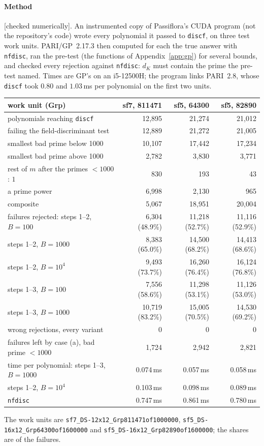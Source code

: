 \documentclass[10pt,a4paper]{article}
\newcommand{\code}[1]{\texttt{#1}}
\newcommand{\stnum}{\textsf{\small[checked numerically]}\xspace}
\theoremstyle{plain}
\theoremstyle{definition}
\begin{document}
\paragraph{Method} \stnum.  An instrumented copy of Passiflora's CUDA program (not the repository's code) wrote every polynomial
it passed to \code{discf}, on three test work units.  PARI/GP~2.17.3 then computed for each the true answer with \code{nfdisc}, ran
the pre-test (the functions of Appendix~\ref{app:gp}) for several bounds, and checked every rejection against \code{nfdisc}: $d_K$
must contain the prime the pre-test named.  Times are GP's on an i5-12500H; the program links PARI~2.8, whose \code{discf} took
$0.80$ and $1.03$\,ms per polynomial on the first two units.

\begin{center}
\small
\begin{tabular}{@{}lrrr@{}}
\toprule
work unit (Grp) & sf7, 811471 & sf5, 64300 & sf5, 82890 \\
\midrule
polynomials reaching \code{discf} & 12{,}895 & 21{,}274 & 21{,}012 \\
\quad failing the field-discriminant test & 12{,}889 & 21{,}272 & 21{,}005 \\
\quad smallest bad prime below 1000 & 10{,}107 & 17{,}442 & 17{,}234 \\
\quad smallest bad prime above 1000 & 2{,}782 & 3{,}830 & 3{,}771 \\
rest of $m$ after the primes $<1000$: $1$ & 830 & 193 & 43 \\
\quad a prime power & 6{,}998 & 2{,}130 & 965 \\
\quad composite & 5{,}067 & 18{,}951 & 20{,}004 \\
\midrule
failures rejected: steps 1--2, $B=100$ & 6{,}304 (48.9\%) & 11{,}218 (52.7\%) & 11{,}116 (52.9\%) \\
\quad steps 1--2, $B=1000$ & 8{,}383 (65.0\%) & 14{,}500 (68.2\%) & 14{,}413 (68.6\%) \\
\quad steps 1--2, $B=10^4$ & 9{,}493 (73.7\%) & 16{,}260 (76.4\%) & 16{,}124 (76.8\%) \\
\quad steps 1--3, $B=100$ & 7{,}556 (58.6\%) & 11{,}298 (53.1\%) & 11{,}126 (53.0\%) \\
\quad steps 1--3, $B=1000$ & 10{,}719 (83.2\%) & 15{,}005 (70.5\%) & 14{,}530 (69.2\%) \\
\quad wrong rejections, every variant & 0 & 0 & 0 \\
failures left by case (a), bad prime $<1000$ & 1{,}724 & 2{,}942 & 2{,}821 \\
\midrule
time per polynomial: steps 1--3, $B=1000$ & 0.074\,ms & 0.057\,ms & 0.058\,ms \\
\quad steps 1--2, $B=10^4$ & 0.103\,ms & 0.098\,ms & 0.089\,ms \\
\quad \code{nfdisc} & 0.747\,ms & 0.861\,ms & 0.780\,ms \\
\bottomrule
\end{tabular}
\end{center}
{\sloppy\noindent The work units are \code{sf7\_DS-12x12\_Grp811471of1000000}, \code{sf5\_DS-16x12\_Grp64300of1600000} and
\code{sf5\_DS-16x12\_Grp82890of1600000}; the shares are of the failures.\par}
\medskip
\end{document}

